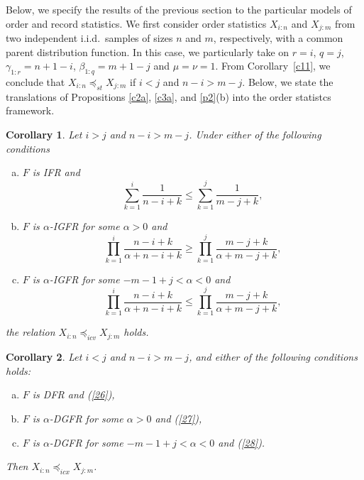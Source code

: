 \documentclass [11pt]{article}
\newtheorem{corollary}{Corollary}
\begin{document}
Below, we specify the results of the previous section  to the particular models of order and record statistics.
We first consider order statistics $X_{i:n}$ and $X_{j:m}$  from two independent i.i.d.\ samples of sizes $n$ and $m$, respectively,
with a common parent distribution function.
In this case, we particularly take on $r=i$, $q=j$, $\gamma_{1:r}=n+1-i$, $\beta_{1:q}= m+1-j$ and $\mu=\nu=1$.
From Corollary~\ref{c11}, we conclude that $X_{i:n} \preceq_{st}X_{j:m}$ if $i<j$ and $n-i>m-j$.
Below, we state the translations of Propositions \ref{c2a}, \ref{c3a}, and \ref{p2}(b) into the order statistcs framework.
\begin{corollary}\label{coos1}
Let $i>j$ and $n-i >m-j$. Under either of the following conditions
    \begin{enumerate}[(a)]
    \item
    $F$ is IFR and
    \begin{equation}
    \label{26}
    \sum_{k=1}^i \frac{1}{n-i+k} \leq \sum_{k=1}^j \frac{1}{m-j+k},
    \end{equation}

    \item
    $F$ is $\alpha$-IGFR for some $\alpha >0$ and
    \begin{equation}
    \label{27}
    \prod_{k=1}^i \frac{n-i+k}{\alpha+n-i+k} \geq
    \prod_{k=1}^j \frac{m-j+k}{\alpha+m-j+k},
    \end{equation}

    \item
    $F$ is $\alpha$-IGFR for some $-m-1+j < \alpha<0$ and
    \begin{equation}
    \label{28}
    \prod_{k=1}^i \frac{n-i+k}{\alpha+n-i+k} \leq
    \prod_{k=1}^j \frac{m-j+k}{\alpha+m-j+k},
    \end{equation}
    \end{enumerate}
the relation $X_{i:n} \preceq_{icv} X_{j:m}$ holds.
\end{corollary}

{\samepage
\begin{corollary}\label{coos2}
Let $i<j$ and $n-i >m-j$, and either of the following conditions holds:
    \begin{enumerate}[(a)]
    \item $F$ is DFR and (\ref{26}),
    \item $F$ is $\alpha$-DGFR for some $\alpha >0$ and (\ref{27}),
    \item $F$ is $\alpha$-DGFR for some $-m-1+j <\alpha <0$ and (\ref{28}).
    \end{enumerate}
Then $X_{i:n} \preceq_{icx} X_{j:m}$.
\end{corollary}
}
\end{document}
